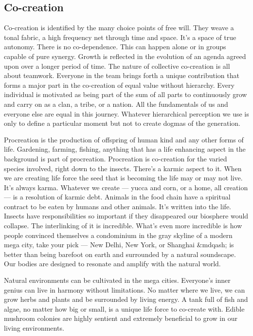 \subsection{Co-creation}\label{co-creation}

Co-creation is identified by the many choice points of free will. They
weave a tonal fabric, a high frequency net through time and space. It's
a space of true autonomy. There is no co-dependence. This can happen
alone or in groups capable of pure synergy. Growth is reflected in the
evolution of an agenda agreed upon over a longer period of time. The
nature of collective co-creation is all about teamwork. Everyone in the
team brings forth a unique contribution that forms a major part in the
co-creation of equal value without hierarchy. Every individual is
motivated as being part of the sum of all parts to continuously grow and
carry on as a clan, a tribe, or a nation. All the fundamentals of us and
everyone else are equal in this journey. Whatever hierarchical
perception we use is only to define a particular moment but not to
create dogmas of the generation.

Procreation is the production of offspring of human kind and any other
forms of life. Gardening, farming, fishing, anything that has a life
enhancing aspect in the background is part of procreation. Procreation
is co-creation for the varied species involved, right down to the
insects. There's a karmic aspect to it. When we are creating life force
the seed that is becoming the life may or may not live. It's always
karma. Whatever we create --- yucca and corn, or a home, all creation
--- is a resolution of karmic debt. Animals in the food chain have a
spiritual contract to be eaten by humans and other animals. It's written
into the life. Insects have responsibilities so important if they
disappeared our biosphere would collapse. The interlinking of it is
incredible. What's even more incredible is how people convinced
themselves a condominium in the gray skyline of a modern mega city, take
your pick --- New Delhi, New York, or Shanghai \&mdqash; is better than
being barefoot on earth and surrounded by a natural soundscape. Our
bodies are designed to resonate and amplify with the natural world.

Natural environments can be cultivated in the mega cities. Everyone's
inner genius can live in harmony without limitations. No matter where we
live, we can grow herbs and plants and be surrounded by living energy. A
tank full of fish and algae, no matter how big or small, is a unique
life force to co-create with. Edible mushroom colonies are highly
sentient and extremely beneficial to grow in our living environments.


